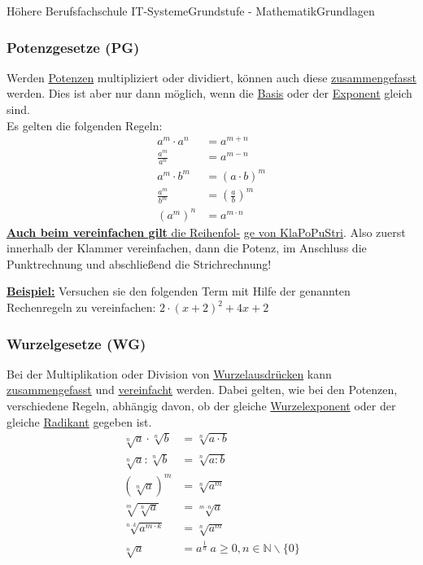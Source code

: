 \documentclass[11pt,twocolumn,oneside,openany,headings=optiontotoc,11pt,numbers=noenddot]{article}
\begin{document}
\begin{worksheet}{Höhere Berufsfachschule IT-Systeme}{Grundstufe - Mathematik}{Grundlagen}
		\subsubsection*{Potenzgesetze (PG)}
		Werden \underline{Potenzen} multipliziert oder dividiert, können auch diese \underline{zusammengefasst} werden. Dies ist aber nur dann möglich, wenn die \underline{Basis} oder der \underline{Exponent} gleich sind.\\
		Es gelten die folgenden Regeln:
		\begin{align*}
			a^m\cdot{}a^n & = a ^{m+n}\\
			\frac{a^m}{a^n} & = a^{m-n}\\
			a^m\cdot{}b^m & = (a\cdot{}b)^m\\
			\frac{a^m}{b^m} & = \left(\frac{a}{b}\right)^m\\
			(a^m)^n & = a^{m\cdot{}n}
		\end{align*}
		\newpage
		\underline{\textbf{Auch beim vereinfachen gilt} die Reihenfol-} \underline{ge von \color{red}KlaPoPuStri\normalcolor}. Also zuerst innerhalb der Klammer vereinfachen, dann die Potenz, im Anschluss die Punktrechnung und abschließend die Strichrechnung!\\
		\par\bigskip\noindent
		\underline{\textbf{Beispiel:}} Versuchen sie den folgenden Term mit Hilfe der genannten Rechenregeln zu vereinfachen: \(2\cdot{}(x+2)^2 + 4x + 2\)
		\subsubsection*{Wurzelgesetze (WG)}
		Bei der Multiplikation oder Division von \underline{Wurzelausdrücken} kann \underline{zusammengefasst} und \underline{vereinfacht} werden. Dabei gelten, wie bei den Potenzen, verschiedene Regeln, abhängig davon, ob der gleiche \underline{Wurzelexponent} oder der gleiche \underline{Radikant} gegeben ist.
		\begin{align*}
			\sqrt[n]{a}\cdot\sqrt[n]{b} & = \sqrt[n]{a\cdot{}b}\\
			\sqrt[n]{a}:\sqrt[n]{b} & = \sqrt[n]{a:b}\\
			(\sqrt[n]{a})^m & = \sqrt[n]{a^m}\\
			\sqrt[m]{\sqrt[n]{a}} & = \sqrt[m\cdot{}n]{a}\\
			\sqrt[n\cdot{}k]{a^{m\cdot{}k}} & = \sqrt[n]{a^m}\\
			\sqrt[n]{a} & = a^{\frac{1}{n}}\ a\geq 0, n\in\mathbb{N}\backslash\{0\}
		\end{align*}

\end{worksheet}
\end{document}
